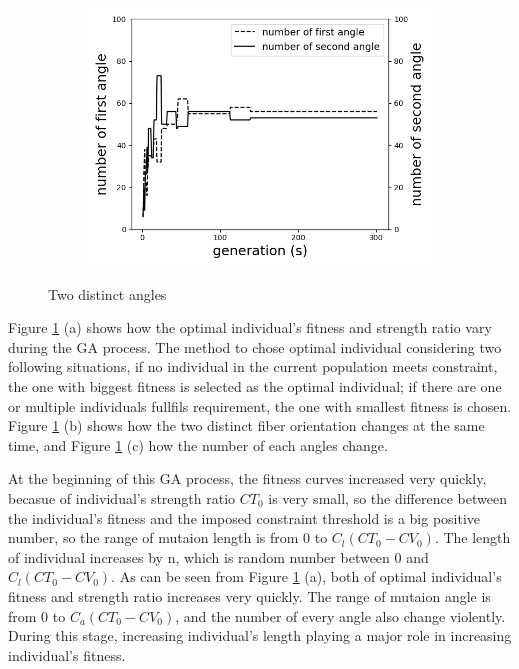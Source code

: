 \begin{figure}[!t]
		\begin{subfigure}[b]{0.8\linewidth}
			\includegraphics[width=\linewidth]{2020-11-10-pre-image/two_distinct_angler_number_change.png}
		\end{subfigure}
	\caption{Two distinct angles}
	\label{fig:two_angles}
\end{figure}



Figure \ref{fig:two_angles} (a) shows how the optimal individual's fitness and strength
ratio vary during the GA process. The method to chose optimal individual considering two following
situations, if no individual in the current population meets constraint, the one with biggest
fitness is selected as the optimal individual; if there are one or multiple individuals fullfils
requirement, the one with smallest fitness is chosen.  Figure \ref{fig:two_angles} (b) shows how the two distinct fiber
orientation changes at the same time, and Figure  \ref{fig:two_angles} (c) how the number of each angles change.

	At the beginning of this GA process, the fitness curves increased very quickly, becasue of
individual's strength ratio $CT_0$ is very small, so the difference between the individual's fitness and
the imposed constraint threshold is a big positive number, so the range of mutaion length is from 0
to $C_l(CT_0 - CV_0)$. The length of individual increases by n, which is random number between 0 and 
$C_l(CT_0 - CV_0)$. As can be seen from Figure \ref{fig:two_angles} (a), both of optimal
individual's fitness and strength ratio increases very quickly.  The range of mutaion angle is from
0 to $C_a(CT_0 - CV_0)$, and the number of every angle also change violently. During this stage,
increasing individual's length playing a major role in increasing individual's fitness.

